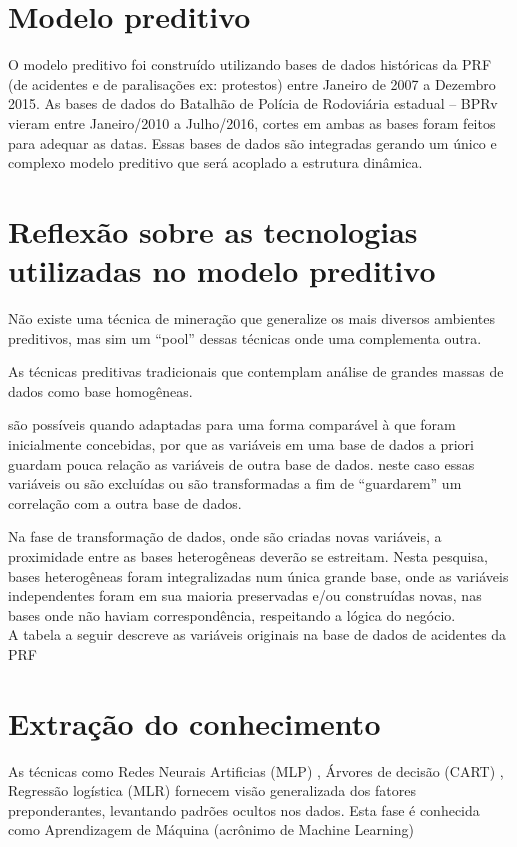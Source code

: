 \section{Modelo preditivo}

O modelo preditivo foi construído utilizando bases de dados históricas da PRF (de acidentes e de paralisações ex: protestos) entre Janeiro de 2007 a 
Dezembro 2015. As bases de dados do Batalhão de Polícia de Rodoviária estadual -- BPRv vieram entre Janeiro/2010 a Julho/2016, cortes em ambas as bases foram 
feitos para adequar as datas. Essas bases de dados são integradas gerando um único e complexo modelo preditivo que será acoplado a estrutura dinâmica.



\section{Reflexão sobre as tecnologias utilizadas no modelo preditivo}\label{result}

Não existe uma técnica de mineração que generalize os mais diversos ambientes preditivos, mas sim um ``pool'' dessas técnicas onde uma complementa outra.

As técnicas preditivas tradicionais que contemplam análise de grandes massas de dados como base homogêneas.

são possíveis quando adaptadas para uma forma comparável à que
foram inicialmente concebidas, por que as variáveis em uma base de dados a priori guardam pouca relação as variáveis de outra base de dados.
neste caso essas variáveis ou são excluídas ou são transformadas a fim de ``guardarem'' um correlação com a outra base de dados. 

Na fase de transformação de dados, onde são criadas novas variáveis, a proximidade entre as
bases heterogêneas deverão se estreitam. 
Nesta pesquisa, bases heterogêneas foram integralizadas num única grande base, onde as variáveis independentes foram
em sua maioria preservadas e/ou construídas novas, nas bases onde não haviam correspondência, respeitando a lógica do negócio.\\
A tabela a seguir descreve as variáveis originais na base de dados de acidentes da PRF 


\section{Extração do conhecimento}

As técnicas como Redes Neurais Artificias (MLP) \cite{DecisaoCredito}, Árvores de decisão (CART) \cite{DataMining}, Regressão logística (MLR) 
\cite{RegrecaoLog} fornecem visão generalizada dos fatores preponderantes, levantando padrões ocultos nos dados. Esta fase é conhecida como 
Aprendizagem de Máquina (acrônimo de Machine Learning)

